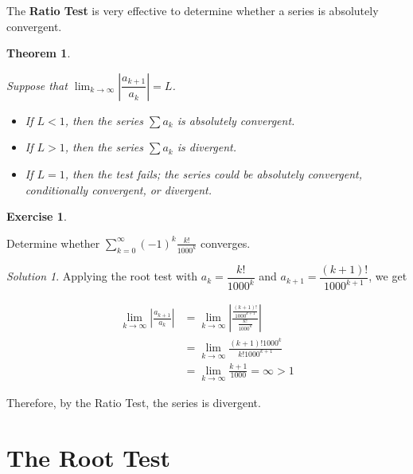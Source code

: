 \documentclass[
]{book}
\providecommand{\tightlist}{%
  \setlength{\itemsep}{0pt}\setlength{\parskip}{0pt}}
\newtheorem{theorem}{Theorem}[chapter]
\theoremstyle{definition}
\theoremstyle{definition}
\theoremstyle{definition}
\newtheorem{exercise}{Exercise}[chapter]
\theoremstyle{definition}
\theoremstyle{remark}
\newtheorem*{solution}{Solution}
\begin{document}
The \textbf{Ratio Test} is very effective to determine whether a series is absolutely convergent.

\begin{theorem}
\protect\hypertarget{thm:unlabeled-div-229}{}\label{thm:unlabeled-div-229}

Suppose that \(\displaystyle \lim_{k\to\infty} \left | \dfrac{a_{k+1}}{a_k}\right |=L\).

\begin{itemize}
\tightlist
\item
  If \(L<1\), then the series \(\displaystyle \sum a_k\) is absolutely convergent.
\item
  If \(L>1\), then the series \(\displaystyle \sum a_k\) is divergent.
\item
  If \(L=1\), then the test fails; the series could be absolutely convergent, conditionally convergent, or divergent.
\end{itemize}

\end{theorem}

\begin{exercise}
\protect\hypertarget{exr:unlabeled-div-230}{}\label{exr:unlabeled-div-230}

Determine whether \(\displaystyle \sum_{k=0}^\infty (-1)^k\frac{k!}{1000^k}\) converges.

\end{exercise}

\begin{solution}

Applying the root test with \(a_k= \dfrac{k!}{1000^k}\) and \(a_{k+1}=\dfrac{(k+1)!}{1000^{k+1}}\), we get

\begin{align*}
\lim_{k\to\infty}\left | \frac{a_{k+1}}{a_k}\right| &= \lim_{k\to\infty}\left | \frac{\frac{(k+1)!}{1000^{k+1}}}{\frac{k!}{1000^k}}\right | \\
&= \lim_{k\to\infty} \frac{(k+1)!1000^k}{k!1000^{k+1}} \\
&= \lim_{k\to\infty} \frac{k+1}{1000} = \infty >1
\end{align*}

Therefore, by the Ratio Test, the series is divergent.

\end{solution}

\hypertarget{the-root-test}{%
\section{The Root Test}\label{the-root-test}}
\end{document}
